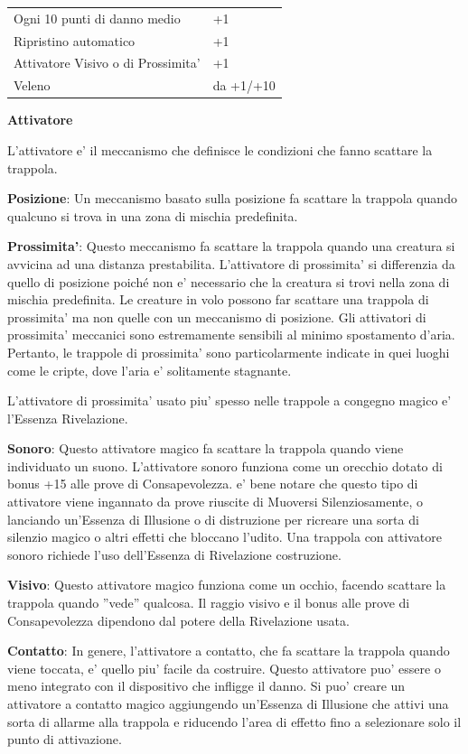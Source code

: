\documentclass[a4paper,11pt,twoside,openany]{book}
\begin{document}
{\begin{tabular}{ll}
			Ogni 10 punti di danno medio &+1\\
			Ripristino automatico &+1\\
			Attivatore Visivo o di Prossimita’ &+1\\
			Veleno &da +1/+10\\
			
		\end{tabular}
		
		\bigskip
		
		\textbf{Attivatore}
		
		L'attivatore e' il meccanismo che definisce le condizioni che fanno scattare la trappola.
		
		\textbf{Posizione}: Un meccanismo basato sulla posizione fa scattare la trappola quando qualcuno si trova in una zona di mischia predefinita.
		
		\textbf{Prossimita'}: Questo meccanismo fa scattare la trappola quando una creatura si avvicina ad una distanza prestabilita. L'attivatore di prossimita' si differenzia da quello di posizione poiché non e' necessario che la creatura si trovi nella zona di mischia predefinita. Le creature in volo possono far scattare una trappola di prossimita' ma non quelle con un meccanismo di posizione. Gli attivatori di prossimita' meccanici sono estremamente sensibili al minimo spostamento d'aria. Pertanto, le trappole di prossimita' sono particolarmente indicate in quei luoghi come le cripte, dove l'aria e' solitamente stagnante.
		
		L'attivatore di prossimita' usato piu' spesso nelle trappole a congegno magico e' l'Essenza Rivelazione.
		
		\textbf{Sonoro}: Questo attivatore magico fa scattare la trappola quando viene individuato un suono. L'attivatore sonoro funziona come un orecchio dotato di bonus +15 alle prove di Consapevolezza. e' bene notare che questo tipo di attivatore viene ingannato da prove riuscite di Muoversi Silenziosamente, o lanciando un'Essenza di Illusione o di distruzione per ricreare una sorta di silenzio magico o altri effetti che bloccano l'udito. Una trappola con attivatore sonoro richiede l'uso dell'Essenza di Rivelazione costruzione.
		
		\textbf{Visivo}: Questo attivatore magico funziona come un occhio, facendo scattare la trappola quando ''vede'' qualcosa. Il raggio visivo e il bonus alle prove di Consapevolezza dipendono dal potere della Rivelazione usata.
		
		\textbf{Contatto}: In genere, l'attivatore a contatto, che fa scattare la trappola quando viene toccata, e' quello piu' facile da costruire. Questo attivatore puo' essere o meno integrato con il dispositivo che infligge il danno. Si puo' creare un attivatore a contatto magico aggiungendo un'Essenza di Illusione che attivi una sorta di allarme alla trappola e riducendo l'area di effetto fino a selezionare solo il punto di attivazione.
		
}
\end{document}

